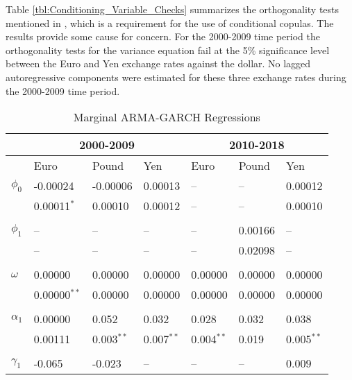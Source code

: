 \documentclass[12pt]{article}
\begin{document}
Table \ref{tbl:Conditioning_Variable_Checks} summarizes the orthogonality tests mentioned in \cite{Patton_2006}, which is a requirement for the use of conditional copulas. The results provide some cause for concern. For the 2000-2009 time period the orthogonality tests for the variance equation fail at the 5\% significance level between the Euro and Yen exchange rates against the dollar. No lagged autoregressive components were estimated for these three exchange rates during the 2000-2009 time period. 


\begin{table}
	\fontsize{10pt}{10pt}\selectfont
	\centering
	\caption{Marginal ARMA-GARCH Regressions}
	\begin{tabular}{l l l l | l l l}
		\midrule
				   & \multicolumn{3}{c}{2000-2009} & \multicolumn{3}{c}{2010-2018} \\
		\midrule
				   & Euro & Pound & Yen & Euro & Pound & Yen \\
		\midrule
         $\phi_{0}$    &  -0.00024        & -0.00006     & 0.00013      &    --        &    --        & 0.00012      \\
                       &   0.00011$^{*}$  &  0.00010     & 0.00012      &    --        &    --        & 0.00010      \\ \\
		 $\phi_{1}$    &     --           &     --       &    --        &    --        & 0.00166      &    --        \\
		               &     --           &     --       &    --        &    --        & 0.02098      &    --        \\ \\
         $\omega$      &  0.00000         &  0.00000     & 0.00000      & 0.00000      & 0.00000      & 0.00000      \\
                       &  0.00000$^{**}$  &  0.00000     & 0.00000      & 0.00000      & 0.00000      & 0.00000      \\ \\
         $\alpha_{1}$  &  0.00000         &  0.052       & 0.032        & 0.028        & 0.032        & 0.038        \\
                       &  0.00111         & 0.003$^{**}$ & 0.007$^{**}$ & 0.004$^{**}$ & 0.019        & 0.005$^{**}$ \\ \\
         $\gamma_{1}$  & -0.065           & -0.023       &    --        &    --        &    --        & 0.009        \\

\end{tabular}
\end{table}
\end{document}

